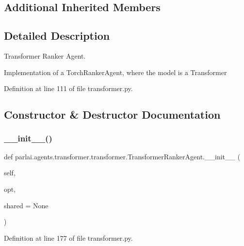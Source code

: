 \subsection*{Additional Inherited Members}


\subsection{Detailed Description}
\begin{DoxyVerb}Transformer Ranker Agent.

Implementation of a TorchRankerAgent, where the model is a Transformer
\end{DoxyVerb}
 

Definition at line 111 of file transformer.\+py.



\subsection{Constructor \& Destructor Documentation}
\mbox{\label{classparlai_1_1agents_1_1transformer_1_1transformer_1_1TransformerRankerAgent_a677c14e106614404f5c5f8605b90ce3e}} 
\subsubsection{\texorpdfstring{\+\_\+\+\_\+init\+\_\+\+\_\+()}{\_\_init\_\_()}}
{\footnotesize\ttfamily def parlai.\+agents.\+transformer.\+transformer.\+Transformer\+Ranker\+Agent.\+\_\+\+\_\+init\+\_\+\+\_\+ (\begin{DoxyParamCaption}\item[{}]{self,  }\item[{}]{opt,  }\item[{}]{shared = {\ttfamily None} }\end{DoxyParamCaption})}



Definition at line 177 of file transformer.\+py.



